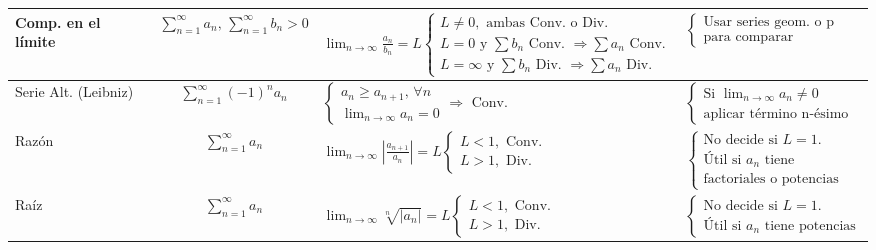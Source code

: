 \begin{table}[H]
{\begin{tabular}{|l|c|l|l|}
Comp. en el límite & $\displaystyle\sum_{n=1}^{\infty}a_n, \,\displaystyle\sum_{n=1}^{\infty}b_n >0$ & $\displaystyle\lim_{n \rightarrow \infty}\frac{a_n}{b_n}=L \begin{cases} L \neq 0, \text{ ambas Conv. o Div.} \\ L = 0 \text{ y } \displaystyle\sum b_n \text{ Conv. } \Longrightarrow \displaystyle\sum a_n \text{ Conv.} \\ L = \infty \text{ y } \displaystyle\sum b_n \text{ Div. } \Longrightarrow \displaystyle\sum a_n \text{ Div.}\end{cases}$ & $\begin{cases} \text{Usar series geom. o p} \\ \text{para comparar} \end{cases}$ \\ \hline
Serie Alt. (Leibniz) & $\displaystyle\sum_{n=1}^{\infty}(-1)^n a_n$ & $\begin{cases} a_n \geq a_{n+1}, \, \forall n \\ \displaystyle\lim_{n \rightarrow \infty}a_n = 0 \end{cases} \Longrightarrow \text{ Conv.}$ & $\begin{cases} \text{Si } \displaystyle\lim_{n \rightarrow \infty}a_n \neq 0 \\ \text{aplicar término n-ésimo}\end{cases}$ \\ \hline
Razón & $\displaystyle\sum_{n=1}^{\infty}a_n$ & $\displaystyle\lim_{n \rightarrow \infty}\left|\frac{a_{n+1}}{a_n}\right|= L \begin{cases} L < 1 , \text{ Conv.} \\ L > 1, \text{ Div.} \end{cases}$ & $\begin{cases} \text{No decide si } L = 1. \\ \text{Útil si } a_n \text{ tiene} \\ \text{factoriales o potencias} \end{cases}$ \\ \hline
Raíz & $\displaystyle\sum_{n=1}^{\infty}a_n$ & $\displaystyle\lim_{n \rightarrow \infty}\sqrt[n]{|a_n|}= L \begin{cases} L < 1 , \text{ Conv.} \\ L > 1, \text{ Div.} \end{cases}$ & $\begin{cases} \text{No decide si } L = 1. \\ \text{Útil si } a_n \text{ tiene potencias} \end{cases}$ \\ \hline

\end{tabular}}
\end{table}
